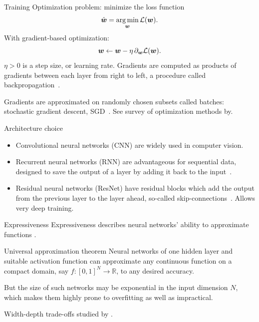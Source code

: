 \documentclass[9pt]{beamer}
\begin{document}
\begin{frame}{Training}
Optimization problem: minimize the loss function
\begin{equation*}
    \hat {\boldsymbol{w}} = \operatorname*{arg\,min}_{\boldsymbol{w}} \mathcal{L}(\boldsymbol{w}).
\end{equation*}
With gradient-based optimization: 
\begin{equation*}
    \boldsymbol{w} \leftarrow \boldsymbol{w} - \eta\, \partial_{\boldsymbol{w}} \mathcal{L}(\boldsymbol{w}).
\end{equation*}
$\eta > 0$ is a \alert{step size}, or \alert{learning rate}. Gradients are computed as products of gradients between each layer \alert{from right to left}, a procedure called \alert{backpropagation}~\citep{rumelhart1986learning}.

Gradients are approximated on randomly chosen subsets called \alert{batches}: stochastic gradient descent, SGD~\citep{robbins1951stochastic}. See survey of optimization methods by\citet{sun2019survey}.
\end{frame}



\begin{frame}{Architecture choice}

\begin{itemize}
	\item \alert{Convolutional neural networks (CNN)} are widely used in computer vision.
	\item \alert{Recurrent neural networks (RNN)} are advantageous for sequential data, designed to save the output of a layer by adding it back to the input~\citep{hochreiter1997long}.
	\item \alert{Residual neural networks (ResNet)} have residual blocks which add the output from the previous layer to the layer ahead, so-called \alert{skip-connections}~\citep{he2016deep}. Allows very deep  training.
\end{itemize}
\end{frame}



\begin{frame}{Expressiveness}
Expressiveness describes neural networks’ ability to approximate functions \citep{cybenko1989approximation, funahashi1989approximate, hornik1989multilayer,barron1994approximation}. 

\begin{block}{Universal approximation theorem}
	Neural networks of one hidden layer and suitable activation function can approximate any continuous function on a compact domain, say $f: [0,1]^N \to \mathbb{R}$, to any desired accuracy.
\end{block}

\alert{But} the size of such networks may be \alert{exponential in the input dimension $N$}, which makes them highly prone to overfitting as well as impractical.

Width-depth trade-offs studied by \citet{chatziafratis2020depth,chatziafratis2020better}.

\end{frame}
\end{document}
